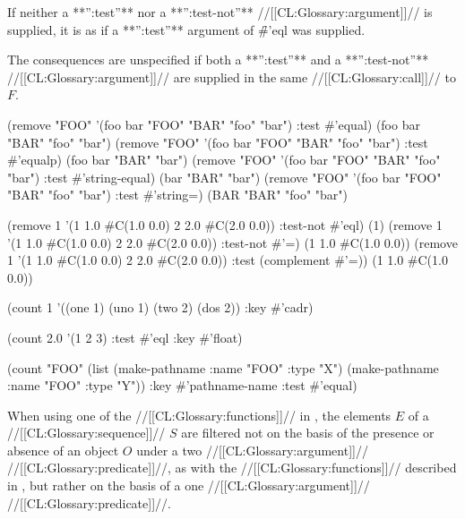 If neither a **'':test''** nor a **'':test-not''** //[[CL:Glossary:argument]]// is supplied,  it is as if a **'':test''** argument of \f{\#'eql} was supplied.

The consequences are unspecified if both a **'':test''** and a **'':test-not''** //[[CL:Glossary:argument]]// are supplied in the same //[[CL:Glossary:call]]// to $F$.


\code
 (remove "FOO" '(foo bar "FOO" "BAR" "foo" "bar") :test #'equal) \EV (foo bar "BAR" "foo" "bar")
 (remove "FOO" '(foo bar "FOO" "BAR" "foo" "bar") :test #'equalp) \EV (foo bar "BAR" "bar")
 (remove "FOO" '(foo bar "FOO" "BAR" "foo" "bar") :test #'string-equal) \EV (bar "BAR" "bar")
 (remove "FOO" '(foo bar "FOO" "BAR" "foo" "bar") :test #'string=) \EV (BAR "BAR" "foo" "bar")

 (remove 1 '(1 1.0 #C(1.0 0.0) 2 2.0 #C(2.0 0.0)) :test-not #'eql) \EV (1)
 (remove 1 '(1 1.0 #C(1.0 0.0) 2 2.0 #C(2.0 0.0)) :test-not #'=) \EV (1 1.0 #C(1.0 0.0))
 (remove 1 '(1 1.0 #C(1.0 0.0) 2 2.0 #C(2.0 0.0)) :test (complement #'=)) \EV (1 1.0 #C(1.0 0.0))

 (count 1 '((one 1) (uno 1) (two 2) (dos 2)) :key #'cadr) 

 (count 2.0 '(1 2 3) :test #'eql :key #'float) 

 (count "FOO" (list (make-pathname :name "FOO" :type "X")  
                    (make-pathname :name "FOO" :type "Y"))
        :key #'pathname-name
        :test #'equal)  \endcode

\endsubsubsection%

\endsubsection%

 

When using one of the //[[CL:Glossary:functions]]// in \thenextfigure, the elements $E$ of a //[[CL:Glossary:sequence]]// $S$ are filtered not on the basis of the presence or absence of an object $O$  under a two //[[CL:Glossary:argument]]// //[[CL:Glossary:predicate]]//, as with the //[[CL:Glossary:functions]]// described in \secref\SatisfyingTheTwoArgTest, but rather on the basis of a one //[[CL:Glossary:argument]]// //[[CL:Glossary:predicate]]//.



